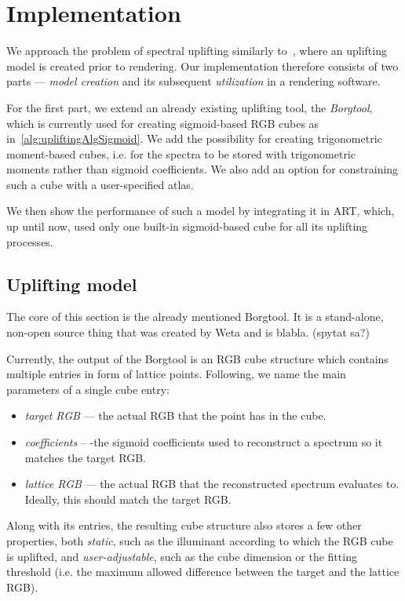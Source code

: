 \chapter{Implementation}

We approach the problem of spectral uplifting similarly to~\citet{upsamplingJakobHanika}, where an uplifting model is created prior to rendering. Our implementation therefore consists of two parts --- \emph{model creation} and its subsequent \emph{utilization} in a rendering software. 

For the first part, we extend an already existing uplifting tool, the \emph{Borgtool}, which is currently used for creating sigmoid-based RGB cubes as in~\cref{alg:upliftingAlgSigmoid}. We add the possibility for creating trigonometric moment-based cubes, i.e. for the spectra to be stored with trigonometric moments rather than sigmoid coefficients. We also add an option for constraining such a cube with a user-specified atlas.

We then show the performance of such a model by integrating it in ART, which, up until now, used only one built-in sigmoid-based cube for all its uplifting processes.

\section{Uplifting model}

The core of this section is the already mentioned Borgtool. It is a stand-alone, non-open source thing that was created by Weta and is blabla. (spytat sa?)

Currently, the output of the Borgtool is an RGB cube structure which contains multiple entries in form of lattice points. Following, we name the main parameters of a single cube entry:
\begin{itemize}
	\item \emph{target RGB} --- the actual RGB that the point has in the cube.
	\item \emph{coefficients} -- -the sigmoid coefficients used to reconstruct a spectrum so it matches the target RGB.
	\item \emph{lattice RGB} --- the actual RGB that the reconstructed spectrum evaluates to. Ideally, this should match the target RGB.
\end{itemize}
Along with its entries, the resulting cube structure also stores a few other properties, both \emph{static}, such as the illuminant according to which the RGB cube is uplifted, and \emph{user-adjustable}, such as the cube dimension or the fitting threshold (i.e. the maximum allowed difference between the target and the lattice RGB).

